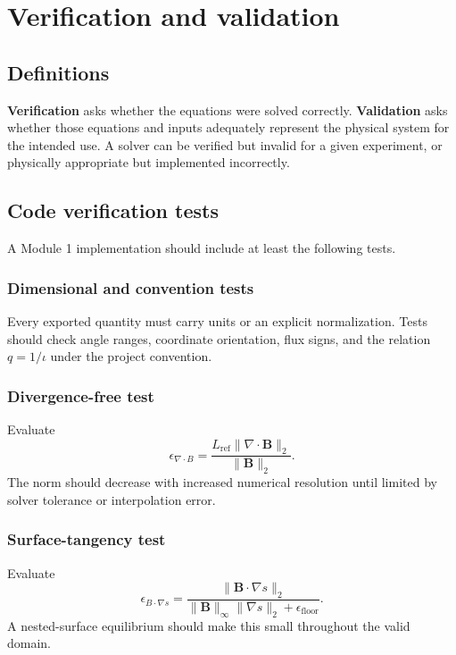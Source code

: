\section{Verification and validation}
\label{sec:verification}

\subsection{Definitions}
\textbf{Verification} asks whether the equations were solved correctly. \textbf{Validation} asks whether those equations and inputs adequately represent the physical system for the intended use. A solver can be verified but invalid for a given experiment, or physically appropriate but implemented incorrectly.

\subsection{Code verification tests}
A Module 1 implementation should include at least the following tests.

\subsubsection{Dimensional and convention tests}
Every exported quantity must carry units or an explicit normalization. Tests should check angle ranges, coordinate orientation, flux signs, and the relation $q=1/\iota$ under the project convention.

\subsubsection{Divergence-free test}
Evaluate
\begin{equation}
\epsilon_{\nabla\cdot B}
=\frac{L_{\mathrm{ref}}\|\nabla\cdot\mathbf B\|_2}{\|\mathbf B\|_2}.
\end{equation}
The norm should decrease with increased numerical resolution until limited by solver tolerance or interpolation error.

\subsubsection{Surface-tangency test}
Evaluate
\begin{equation}
\epsilon_{B\cdot\nabla s}
=\frac{\|\mathbf B\cdot\nabla s\|_2}
{\|\mathbf B\|_\infty\|\nabla s\|_2+\epsilon_{\mathrm{floor}}}.
\end{equation}
A nested-surface equilibrium should make this small throughout the valid domain.

